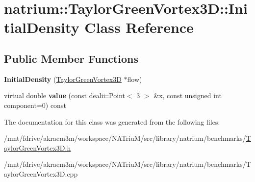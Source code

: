 \hypertarget{classnatrium_1_1TaylorGreenVortex3D_1_1InitialDensity}{
\section{natrium::TaylorGreenVortex3D::InitialDensity Class Reference}
\label{classnatrium_1_1TaylorGreenVortex3D_1_1InitialDensity}
}
\subsection*{Public Member Functions}
\begin{DoxyCompactItemize}
\item 
\hypertarget{classnatrium_1_1TaylorGreenVortex3D_1_1InitialDensity_a42edd1c7cf5a4d141a0cb26d7a860c62}{
{\bfseries InitialDensity} (\hyperlink{classnatrium_1_1TaylorGreenVortex3D}{TaylorGreenVortex3D} $\ast$flow)}
\label{classnatrium_1_1TaylorGreenVortex3D_1_1InitialDensity_a42edd1c7cf5a4d141a0cb26d7a860c62}

\item 
\hypertarget{classnatrium_1_1TaylorGreenVortex3D_1_1InitialDensity_a2f138845e3f3f3adaa094ddaeb5fe6db}{
virtual double {\bfseries value} (const dealii::Point$<$ 3 $>$ \&x, const unsigned int component=0) const }
\label{classnatrium_1_1TaylorGreenVortex3D_1_1InitialDensity_a2f138845e3f3f3adaa094ddaeb5fe6db}

\end{DoxyCompactItemize}


The documentation for this class was generated from the following files:\begin{DoxyCompactItemize}
\item 
/mnt/fdrive/akraem3m/workspace/NATriuM/src/library/natrium/benchmarks/\hyperlink{TaylorGreenVortex3D_8h}{TaylorGreenVortex3D.h}\item 
/mnt/fdrive/akraem3m/workspace/NATriuM/src/library/natrium/benchmarks/TaylorGreenVortex3D.cpp\end{DoxyCompactItemize}
